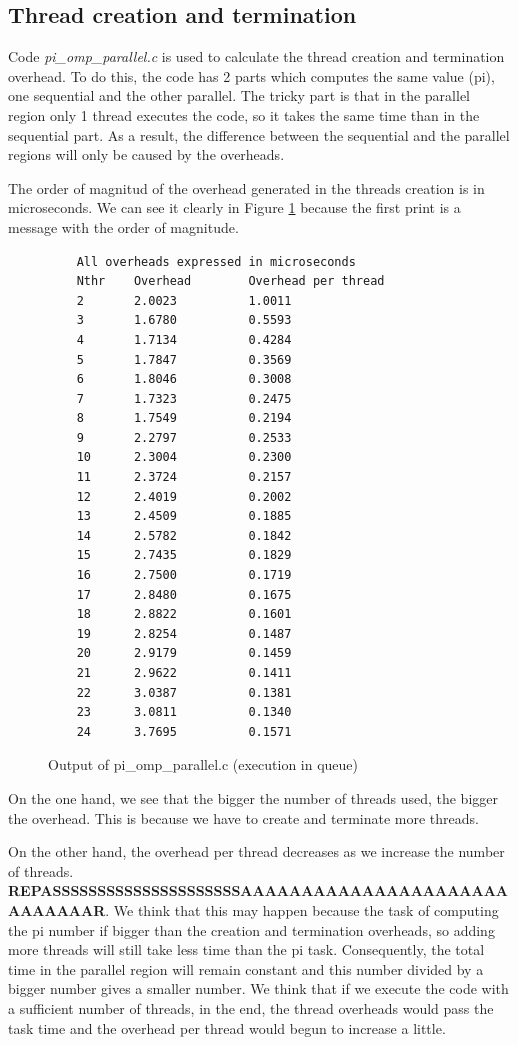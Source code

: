 \documentclass[12pt, a4paper]{article}
\begin{document}
\subsection{Thread creation and termination}

Code \textit{pi\_omp\_parallel.c} is used to calculate the thread creation and termination overhead. To do this, the code has 2 parts which computes the same value (pi), one sequential and the other parallel. The tricky part is that in the parallel region only 1 thread executes the code, so it takes the same time than in the sequential part. As a result, the difference between the sequential and the parallel regions will only be caused by the overheads.

The order of magnitud of the overhead generated in the threads creation is in microseconds. We can see it clearly in Figure \ref{piompparallel} because the first print is a message with the order of magnitude.

\begin{figure}[H]
	\begin{lstlisting}
	All overheads expressed in microseconds
	Nthr    Overhead        Overhead per thread
	2       2.0023          1.0011
	3       1.6780          0.5593
	4       1.7134          0.4284
	5       1.7847          0.3569
	6       1.8046          0.3008
	7       1.7323          0.2475
	8       1.7549          0.2194
	9       2.2797          0.2533
	10      2.3004          0.2300
	11      2.3724          0.2157
	12      2.4019          0.2002
	13      2.4509          0.1885
	14      2.5782          0.1842
	15      2.7435          0.1829
	16      2.7500          0.1719
	17      2.8480          0.1675
	18      2.8822          0.1601
	19      2.8254          0.1487
	20      2.9179          0.1459
	21      2.9622          0.1411
	22      3.0387          0.1381
	23      3.0811          0.1340
	24      3.7695          0.1571
	\end{lstlisting}
	\caption{Output of pi\_omp\_parallel.c (execution in queue)}
	\label{piompparallel}
\end{figure}

On the one hand, we see that the bigger the number of threads used, the bigger the overhead. This is because we have to create and terminate more threads.

On the other hand, the overhead per thread decreases as we increase the number of threads. \textbf{REPASSSSSSSSSSSSSSSSSSSSSAAAAAAAAAAAAAAAAAAAAAAAAAAAAAR}. We think that this may happen because the task of computing the pi number if bigger than the creation and termination overheads, so adding more threads will still take less time than the pi task. Consequently, the total time in the parallel region will remain constant and this number divided by a bigger number gives a smaller number. We think that if we execute the code with a sufficient number of threads, in the end, the thread overheads would pass the task time and the overhead per thread would begun to increase a little.
\end{document}
